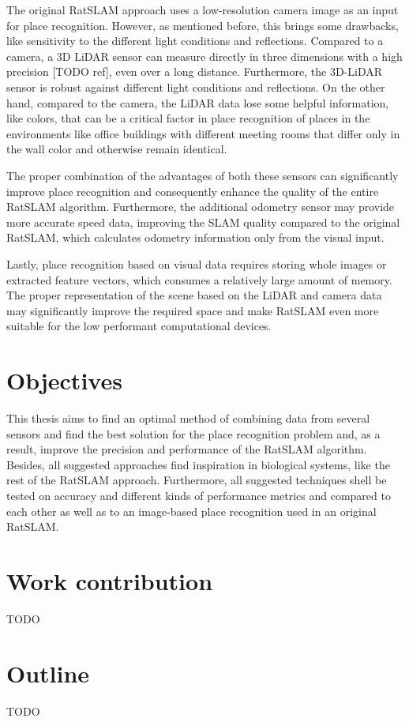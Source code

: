 The original RatSLAM approach uses a low-resolution camera image as an input for place recognition. However, as mentioned before, this brings some drawbacks, like sensitivity to the different light conditions and reflections. Compared to a camera, a 3D LiDAR sensor can measure directly in three dimensions with a high precision [TODO ref], even over a long distance. Furthermore, the 3D-LiDAR sensor is robust against different light conditions and reflections. On the other hand, compared to the camera, the LiDAR data lose some helpful information, like colors, that can be a critical factor in place recognition of places in the environments like office buildings with different meeting rooms that differ only in the wall color and otherwise remain identical.\par
The proper combination of the advantages of both these sensors can significantly improve place recognition and consequently enhance the quality of the entire RatSLAM algorithm. Furthermore, the additional odometry sensor may provide more accurate speed data, improving the SLAM quality compared to the original RatSLAM, which calculates odometry information only from the visual input.\par
Lastly, place recognition based on visual data requires storing whole images or extracted feature vectors, which consumes a relatively large amount of memory. The proper representation of the scene based on the LiDAR and camera data may significantly improve the required space and make RatSLAM even more suitable for the low performant computational devices.

\section{Objectives}

This thesis aims to find an optimal method of combining data from several sensors and find the best solution for the place recognition problem and, as a result, improve the precision and performance of the RatSLAM algorithm. Besides, all suggested approaches find inspiration in biological systems, like the rest of the RatSLAM approach. Furthermore, all suggested techniques shell be tested on accuracy and different kinds of performance metrics and compared to each other as well as to an image-based place recognition used in an original RatSLAM.


\section{Work contribution}

TODO

\section{Outline}

TODO
